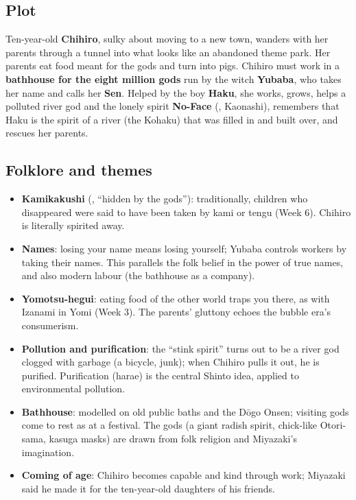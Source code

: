 \subsection{Plot}

Ten-year-old \textbf{Chihiro}, sulky about moving to a new town, wanders with her parents
through a tunnel into what looks like an abandoned theme park. Her parents eat food meant
for the gods and turn into pigs. Chihiro must work in a \textbf{bathhouse for the eight
million gods} run by the witch \textbf{Yubaba}, who takes her name and calls her
\textbf{Sen}. Helped by the boy \textbf{Haku}, she works, grows, helps a polluted river god
and the lonely spirit \textbf{No-Face} (, Kaonashi), remembers that Haku is the
spirit of a river (the Kohaku) that was filled in and built over, and rescues her parents.

\subsection{Folklore and themes}

\begin{itemize}
  \item \textbf{Kamikakushi} (, ``hidden by the gods''): traditionally, children
        who disappeared were said to have been taken by kami or tengu (Week 6). Chihiro is
        literally spirited away.
  \item \textbf{Names}: losing your name means losing yourself; Yubaba controls workers by
        taking their names. This parallels the folk belief in the power of true names, and
        also modern labour (the bathhouse as a company).
  \item \textbf{Yomotsu-hegui}: eating food of the other world traps you there, as with
        Izanami in Yomi (Week 3). The parents' gluttony echoes the bubble era's
        consumerism.
  \item \textbf{Pollution and purification}: the ``stink spirit'' turns out to be a river god
        clogged with garbage (a bicycle, junk); when Chihiro pulls it out, he is purified.
        Purification (harae) is the central Shinto idea, applied to environmental pollution.
  \item \textbf{Bathhouse}: modelled on old public baths and the Dōgo Onsen; visiting
        gods come to rest as at a festival. The gods (a giant radish spirit, chick-like
        Otori-sama, kasuga masks) are drawn from folk religion and Miyazaki's imagination.
  \item \textbf{Coming of age}: Chihiro becomes capable and kind through work; Miyazaki said
        he made it for the ten-year-old daughters of his friends.
\end{itemize}

